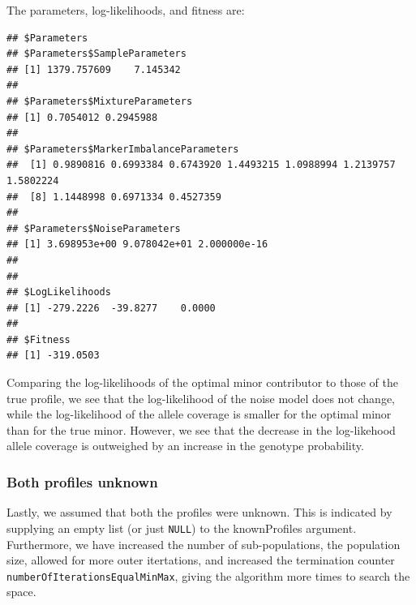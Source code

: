 \documentclass[]{article}
\newenvironment{Shaded}{\begin{snugshade}}{\end{snugshade}}
\newcommand{\KeywordTok}[1]{\textcolor[rgb]{0.13,0.29,0.53}{\textbf{#1}}}
\newcommand{\DecValTok}[1]{\textcolor[rgb]{0.00,0.00,0.81}{#1}}
\newcommand{\StringTok}[1]{\textcolor[rgb]{0.31,0.60,0.02}{#1}}
\newcommand{\OperatorTok}[1]{\textcolor[rgb]{0.81,0.36,0.00}{\textbf{#1}}}
\newcommand{\NormalTok}[1]{#1}
\begin{document}
The parameters, log-likelihoods, and fitness are:

\begin{Shaded}
\end{Shaded}

\begin{verbatim}
## $Parameters
## $Parameters$SampleParameters
## [1] 1379.757609    7.145342
## 
## $Parameters$MixtureParameters
## [1] 0.7054012 0.2945988
## 
## $Parameters$MarkerImbalanceParameters
##  [1] 0.9890816 0.6993384 0.6743920 1.4493215 1.0988994 1.2139757 1.5802224
##  [8] 1.1448998 0.6971334 0.4527359
## 
## $Parameters$NoiseParameters
## [1] 3.698953e+00 9.078042e+01 2.000000e-16
## 
## 
## $LogLikelihoods
## [1] -279.2226  -39.8277    0.0000
## 
## $Fitness
## [1] -319.0503
\end{verbatim}

Comparing the log-likelihoods of the optimal minor contributor to those
of the true profile, we see that the log-likelihood of the noise model
does not change, while the log-likelihood of the allele coverage is
smaller for the optimal minor than for the true minor. However, we see
that the decrease in the log-likehood allele coverage is outweighed by
an increase in the genotype probability.

\subsubsection{Both profiles unknown}\label{both-profiles-unknown}

Lastly, we assumed that both the profiles were unknown. This is
indicated by supplying an empty list (or just \texttt{NULL}) to the
knownProfiles argument. Furthermore, we have increased the number of
sub-populations, the population size, allowed for more outer
itertations, and increased the termination counter
\texttt{numberOfIterationsEqualMinMax}, giving the algorithm more times
to search the space.
\end{document}
